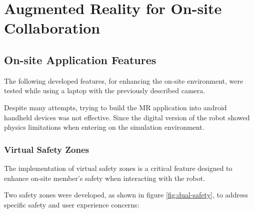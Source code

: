 \chapter{Augmented Reality for On-site Collaboration}%
\label{chapter:on-site}



\section{On-site Application Features}
\label{section:on-site-features}


    The following developed features, for enhancing the on-site environment, were tested while using a laptop with the previously described camera.

    Despite many attempts, trying to build the \ac{MR} application into android handheld devices was not effective.
    Since the digital version of the robot showed physics limitations when entering on the simulation environment.

    \subsection{Virtual Safety Zones}
    \label{subsection:virtual-safety-zones} 


        The implementation of virtual safety zones is a critical feature designed to enhance on-site member's safety when interacting with the robot. 

        Two safety zones were developed, as shown in figure \ref{fig:dual-safety}, to address specific safety and user experience concerns:

